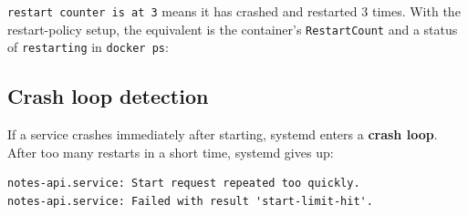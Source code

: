 \begin{codebox}[short]

\begin{Shaded}
\begin{Highlighting}[]
\end{Highlighting}
\end{Shaded}

\end{codebox}

\noindent{}\texttt{restart\ counter\ is\ at\ 3} means it has crashed and restarted 3 times. With the restart-policy setup, the equivalent is the container's \texttt{RestartCount} and a status of \texttt{restarting} in \texttt{docker\ ps}:

\begin{codebox}[short]

\begin{Shaded}
\begin{Highlighting}[]
 
\end{Highlighting}
\end{Shaded}

\end{codebox}

\subsection*{Crash loop detection}\label{25-process-management:crash-loop-detection}

If a service crashes immediately after starting, systemd enters a \textbf{crash loop}. After too many restarts in a short time, systemd gives up:

\begin{outputbox}[short]
\begin{Verbatim}[fontsize=\codesize, breaklines, breakanywhere, breaksymbolleft={\tiny\textcolor{muted}{$\hookrightarrow$}}]
notes-api.service: Start request repeated too quickly.
notes-api.service: Failed with result 'start-limit-hit'.
\end{Verbatim}
\end{outputbox}

